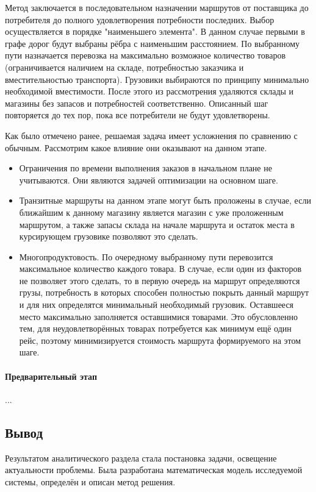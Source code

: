 	Метод заключается в последовательном назначении маршрутов от поставщика до потребителя до полного удовлетворения потребности последних. Выбор осуществляется в порядке "наименьшего элемента". В данном случае первыми в графе дорог будут выбраны рёбра с наименьшим расстоянием. По выбранному пути назначается перевозка на максимально возможное количество товаров (ограничивается наличием на складе, потребностью заказчика и вместительностью транспорта). Грузовики выбираются по принципу минимально необходимой вместимости. После этого из рассмотрения удаляются склады и магазины без запасов и потребностей соответственно. Описанный шаг повторяется до тех пор, пока все потребители не будут удовлетворены.
	
	Как было отмечено ранее, решаемая задача имеет усложнения по сравнению с обычным. Рассмотрим какое влияние они оказывают на данном этапе.
	\begin{itemize}
		\item Ограничения по времени выполнения заказов в начальном плане не учитываются. Они являются задачей оптимизации на основном шаге.
		\item Транзитные маршруты на данном этапе могут быть проложены в случае, если ближайшим к данному магазину является магазин с уже проложенным маршрутом, а также запасы склада на начале маршрута и остаток места в курсирующем грузовике позволяют это сделать.
		\item Многопродуктовость\cite{trans:polyprod}. По очередному выбранному пути перевозится максимальное количество каждого товара. В случае, если один из факторов не позволяет этого сделать, то в первую очередь на маршрут определяются грузы, потребность в которых способен полностью покрыть данный маршрут и для них определятся минимальный необходимый грузовик. Оставшееся место максимально заполняется  оставшимися товарами. Это обусловленно тем, для неудовлетворённых товарах потребуется как минимум ещё один рейс, поэтому минимизируется стоимость маршрута формируемого на этом шаге.
	\end{itemize}
	
	
	\paragraph{Предварительный этап}
	...

\subsection*{Вывод}
	Результатом аналитического раздела стала постановка задачи, освещение актуальности проблемы. Была разработана математическая модель исследуемой системы, определён и описан метод решения.
\pagebreak